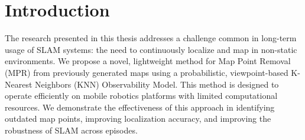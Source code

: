 \section{Introduction}

The research presented in this thesis addresses a challenge common in long-term usage of SLAM systems: the need to continuously localize and map in non-static environments. We propose a novel, lightweight method for Map Point Removal (MPR) from previously generated maps using a probabilistic, viewpoint-based K-Nearest Neighbors (KNN) Observability Model. This method is designed to operate efficiently on mobile robotics platforms with limited computational resources. We demonstrate the effectiveness of this approach in identifying outdated map points, improving localization accuracy, and improving the robustness of SLAM across episodes.











